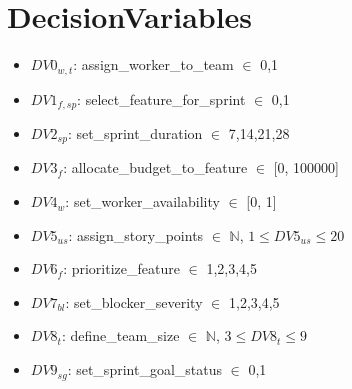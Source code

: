 \documentclass{article}
\begin{document}
\section{DecisionVariables}
\begin{itemize}
    \item $DV0_{w,t}$: assign\_worker\_to\_team $\in$ {0,1}
    \item $DV1_{f,sp}$: select\_feature\_for\_sprint $\in$ {0,1}
    \item $DV2_{sp}$: set\_sprint\_duration $\in$ {7,14,21,28}
    \item $DV3_{f}$: allocate\_budget\_to\_feature $\in$ [0, 100000]
    \item $DV4_{w}$: set\_worker\_availability $\in$ [0, 1]
    \item $DV5_{us}$: assign\_story\_points $\in$ $\mathbb{N}$, $1 \leq DV5_{us} \leq 20$
    \item $DV6_{f}$: prioritize\_feature $\in$ {1,2,3,4,5}
    \item $DV7_{bl}$: set\_blocker\_severity $\in$ {1,2,3,4,5}
    \item $DV8_{t}$: define\_team\_size $\in$ $\mathbb{N}$, $3 \leq DV8_{t} \leq 9$
    \item $DV9_{sg}$: set\_sprint\_goal\_status $\in$ {0,1}
\end{itemize}
\end{document}
